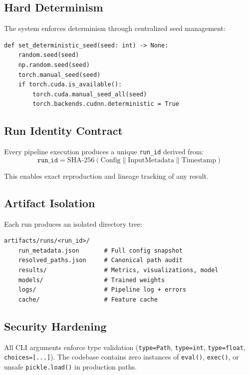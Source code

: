 \documentclass[11pt,a4paper]{article}
\begin{document}
\subsection{Hard Determinism}

The system enforces determinism through centralized seed management:
\begin{lstlisting}
def set_deterministic_seed(seed: int) -> None:
    random.seed(seed)
    np.random.seed(seed)
    torch.manual_seed(seed)
    if torch.cuda.is_available():
        torch.cuda.manual_seed_all(seed)
        torch.backends.cudnn.deterministic = True
\end{lstlisting}

\subsection{Run Identity Contract}

Every pipeline execution produces a unique \texttt{run\_id} derived from:
\begin{equation}
    \texttt{run\_id} = \text{SHA-256}(\text{Config} \| \text{InputMetadata} \| \text{Timestamp})
\end{equation}

This enables exact reproduction and lineage tracking of any result.

\subsection{Artifact Isolation}

Each run produces an isolated directory tree:
\begin{lstlisting}
artifacts/runs/<run_id>/
    run_metadata.json       # Full config snapshot
    resolved_paths.json     # Canonical path audit
    results/                # Metrics, visualizations, model
    models/                 # Trained weights
    logs/                   # Pipeline log + errors
    cache/                  # Feature cache
\end{lstlisting}

\subsection{Security Hardening}

All CLI arguments enforce type validation (\texttt{type=Path}, \texttt{type=int}, \texttt{type=float}, \texttt{choices=[...]}). The codebase contains zero instances of \texttt{eval()}, \texttt{exec()}, or unsafe \texttt{pickle.load()} in production paths.
\end{document}

